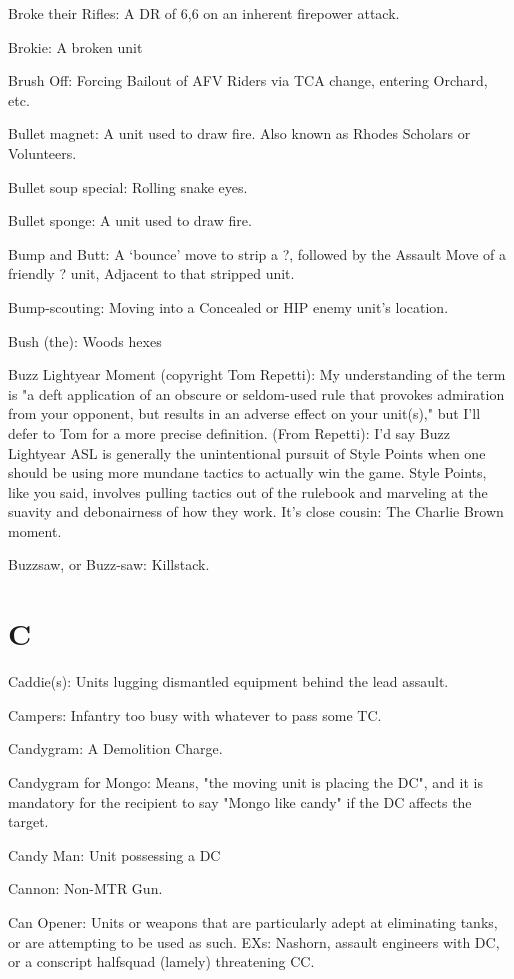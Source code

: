 \documentclass[letterpaper]{article}
\begin{document}
Broke their Rifles: A DR of 6,6 on an inherent firepower attack.

Brokie: A broken unit

Brush Off: Forcing Bailout of AFV Riders via TCA change, entering Orchard, etc.

Bullet magnet: A unit used to draw fire. Also known as Rhodes Scholars or Volunteers.

Bullet soup special: Rolling snake eyes.

Bullet sponge: A unit used to draw fire.

Bump and Butt: A `bounce' move to strip a ?, followed by the Assault Move of a friendly ? unit, Adjacent to that stripped unit.

Bump-scouting: Moving into a Concealed or HIP enemy unit's location.

Bush (the): Woods hexes

Buzz Lightyear Moment (copyright Tom Repetti): My understanding of the term is "a deft application of an obscure or seldom-used rule that provokes admiration from your opponent, but results in an adverse effect on your unit(s)," but I'll defer to Tom for a more precise definition. (From Repetti): I'd say Buzz Lightyear ASL is generally the unintentional pursuit of Style Points when one should be using more mundane tactics to actually win the game. Style Points, like you said, involves pulling tactics out of the rulebook and marveling at the suavity and debonairness of how they work. It's close cousin: The Charlie Brown moment.

Buzzsaw, or Buzz-saw: Killstack.

\section{C}

Caddie(s): Units lugging dismantled equipment behind the lead assault.

Campers: Infantry too busy with whatever to pass some TC.

Candygram: A Demolition Charge. 

Candygram for Mongo: Means, "the moving unit is placing the DC", and it is mandatory for the recipient to say "Mongo like candy" if the DC affects the target. 

Candy Man: Unit possessing a DC

Cannon: Non-MTR Gun.

Can Opener: Units or weapons that are particularly adept at eliminating tanks, or are attempting to be used as such. EXs: Nashorn, assault engineers with DC, or a conscript halfsquad (lamely) threatening CC.
\end{document}
